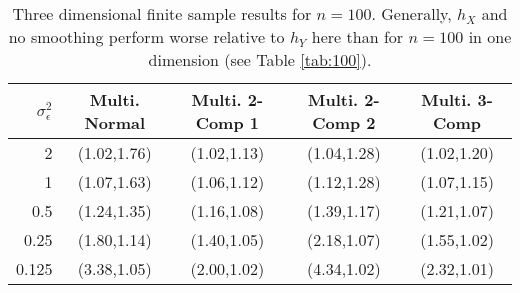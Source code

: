 \begin{table}[ht]
\centering
\begin{tabular}{r|cccc}
  \hline
$\sigma_{\epsilon}^2$ & Multi. Normal & Multi. 2-Comp 1 & Multi. 2-Comp 2 & Multi. 3-Comp \\ 
  \hline
2 & (1.02,1.76) & (1.02,1.13) & (1.04,1.28) & (1.02,1.20) \\ 
  1 & (1.07,1.63) & (1.06,1.12) & (1.12,1.28) & (1.07,1.15) \\ 
  0.5 & (1.24,1.35) & (1.16,1.08) & (1.39,1.17) & (1.21,1.07) \\ 
  0.25 & (1.80,1.14) & (1.40,1.05) & (2.18,1.07) & (1.55,1.02) \\ 
  0.125 & (3.38,1.05) & (2.00,1.02) & (4.34,1.02) & (2.32,1.01) \\ 
   \hline
\end{tabular}
\caption{Three dimensional finite sample results for $n=100$. Generally, $h_X$ and no smoothing perform worse relative to $h_Y$ here than for $n=100$ in one dimension (see Table \ref{tab:100}).} 
\label{tab:multi100}
\end{table}

